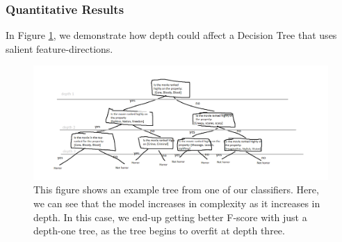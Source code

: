 \subsubsection{Quantitative Results}
In Figure \ref{IntroDecisionTree}, we demonstrate how depth could affect a Decision Tree that uses salient feature-directions. 

\begin{figure}[t]
	\includegraphics[width=\textwidth]{images/decisiontree.png}
	\centering
	\caption{This figure shows an example tree from one of our classifiers. Here, we can see that the model increases in complexity as it increases in depth. In this case, we end-up getting better F-score with just a depth-one tree, as the tree begins to overfit at depth three.  }\label{IntroDecisionTree}
\end{figure}

